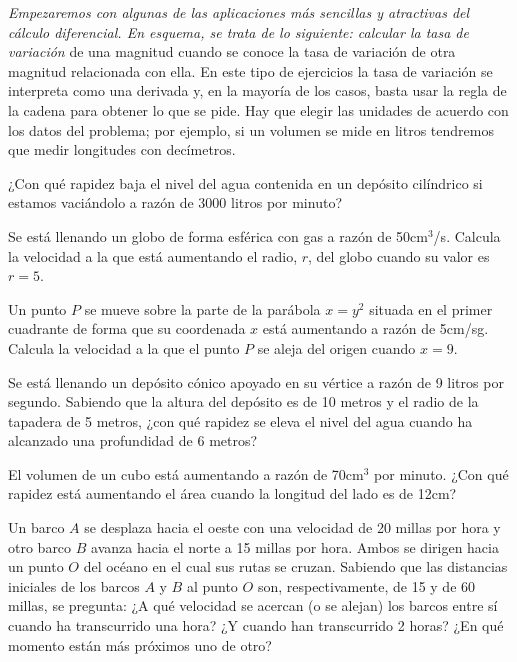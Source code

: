 \begin{ejercicios propuestos} 

%
\item[]\emph{Empezaremos con algunas de las aplicaciones más sencillas 
y atractivas del cálculo diferencial. En esquema, se trata de lo siguiente: 
calcular la tasa de variación} de una magnitud cuando se conoce la 
tasa de variación de otra magnitud relacionada con ella. En este tipo 
de ejercicios la tasa de variación se interpreta como una derivada 
y, en la mayorí­a de los casos, basta usar la regla de la cadena para 
obtener lo que se pide. Hay que elegir las unidades de acuerdo con 
los datos del problema; por ejemplo, si un volumen se mide en litros 
tendremos que medir longitudes con decí­metros.

%

\propuesto ¿Con qué rapidez baja el nivel del agua contenida en un
depósito cilíndrico si estamos vaciándolo a razón de 3000 litros por
minuto?

\propuesto Se está llenando un globo de forma esférica con gas a
razón de 50cm$^{3}$/s. Calcula la velocidad a la que está aumentando
el radio, $r$, del globo cuando su valor es $r=5$.

\propuesto Un punto $P$ se mueve sobre la parte de la parábola $x=y^{2}$
situada en el primer cuadrante de forma que su coordenada $x$ está
aumentando a razón de 5cm/sg. Calcula la velocidad a la que el punto
$P$ se aleja del origen cuando $x=9$.

\propuesto Se está llenando un depósito cónico apoyado en su vértice
a razón de 9 litros por segundo. Sabiendo que la altura del depósito
es de 10 metros y el radio de la tapadera de 5 metros, ¿con qué rapidez
se eleva el nivel del agua cuando ha alcanzado una profundidad de
6 metros?

\propuesto El volumen de un cubo está aumentando a razón de 70cm$^{3}$
por minuto. ¿Con qué rapidez está aumentando el área cuando la longitud
del lado es de 12cm?

\propuesto Un barco $A$ se desplaza hacia el oeste con una velocidad
de 20 millas por hora y otro barco $B$ avanza hacia el norte a 15
millas por hora. Ambos se dirigen hacia un punto $O$ del océano en
el cual sus rutas se cruzan. Sabiendo que las distancias iniciales
de los barcos $A$ y $B$ al punto $O$ son, respectivamente, de 15
y de 60 millas, se pregunta: ¿A qué velocidad se acercan (o se alejan)
los barcos entre sí cuando ha transcurrido una hora? ¿Y cuando han
transcurrido 2 horas? ¿En qué momento están más próximos uno de otro?


\end{ejercicios propuestos}
